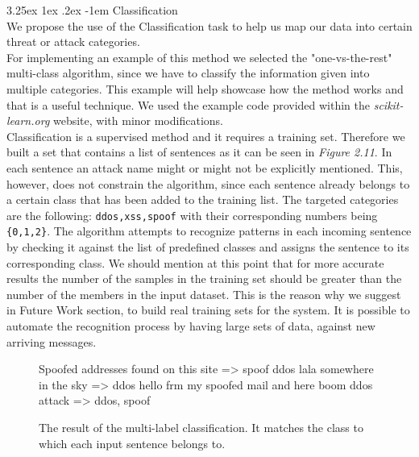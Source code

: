 \documentclass[12pt]{article}
\makeatletter
\renewcommand\paragraph{\@startsection{paragraph}{5}{\z@}%
  {3.25ex \@plus1ex \@minus.2ex}%
  {-1em}%
  {\normalfont\normalsize\bfseries}}
\makeatother
\begin{document}
\paragraph{Classification}
\hfill \break
\\
We propose the use of the Classification task to help us map our data into certain threat or attack categories. 
\hfill \break
\\
For implementing an example of this method we selected the "one-vs-the-rest" multi-class algorithm\cite{classiciation-multilabel}, since we have to classify the information given into multiple categories. This example will help showcase how the method works and that is a useful technique. We used the example code \cite{learn-classification} provided within the \textit{scikit-learn.org} website, with minor modifications.
\hfill \break
\\
Classification is a supervised method and it requires a training set. Therefore we built a set that contains a list of sentences as it can be seen in \textit{Figure 2.11}. In each sentence an attack name might or might not be explicitly mentioned. This, however, does not constrain the algorithm, since each sentence already belongs to a certain class that has been added to the training list. The targeted categories are the following: \texttt{ddos,xss,spoof} with their corresponding numbers being  \texttt{\{0,1,2\}}. The algorithm attempts to recognize patterns in each incoming sentence by checking it against the list of predefined classes and assigns the sentence to its corresponding class. We should mention at this point that for more accurate results the number of the samples in the training set should be greater than the number of the members in the input dataset. This is the reason why we suggest in Future Work section, to build real training sets for the system. It is possible to automate the recognition process by having large sets of data, against new arriving messages.
\hfill \break
\begin{figure}[h!]
\begin{footnotesize}
\begin{spverbatim}
Spoofed addresses found on this site => spoof
ddos lala somewhere in the sky => ddos
hello frm my spoofed mail and here boom ddos attack => ddos, spoof
\end{spverbatim}
\end{footnotesize}
\captionsetup{font=small}
\caption{The result of the multi-label classification. It matches the class to which each input sentence belongs to.}
\label{fig:trainset-result}
\end{figure}
\end{document}
